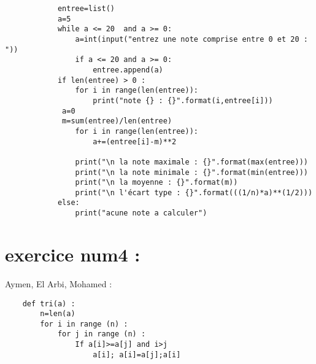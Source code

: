 \documentclass{article}
\begin{document}
    	\begin{lstlisting}
			entree=list()
			a=5
			while a <= 20  and a >= 0:
    			a=int(input("entrez une note comprise entre 0 et 20 : "))
    			if a <= 20 and a >= 0:
        			entree.append(a) 
			if len(entree) > 0 :
    			for i in range(len(entree)):
        			print("note {} : {}".format(i,entree[i]))
   			 a=0
   			 m=sum(entree)/len(entree)
    			for i in range(len(entree)):
        			a+=(entree[i]-m)**2
    
    			print("\n la note maximale : {}".format(max(entree)))
    			print("\n la note minimale : {}".format(min(entree)))
    			print("\n la moyenne : {}".format(m))
    			print("\n l'écart type : {}".format(((1/n)*a)**(1/2)))
			else:
    			print("acune note a calculer")
		\end{lstlisting}

\section{exercice num4 :}
	\begin{center}
    		Aymen, El Arbi, Mohamed :
	\end{center}
	\begin{lstlisting}
    def tri(a) :
        n=len(a)
        for i in range (n) :
            for j in range (n) :
                If a[i]>=a[j] and i>j
                    a[i]; a[i]=a[j];a[i]
	\end{lstlisting}
\end{document}
